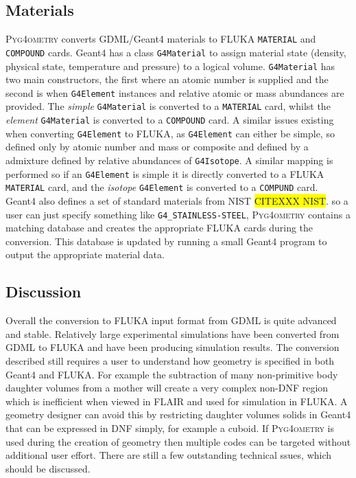 \documentclass[final,5p,times,twocolumn]{elsarticle}
\newcommand{\pyinline}[1]{\lstinline[postbreak={}]{#1}}
\newcommand{\cpinline}[1]{\lstinline[postbreak={}]{#1}}
\newcommand{\fluka}[1]{\texttt{\MakeUppercase{#1}}}
\newcommand{\PYGEOMETRY}{\textsc{Pyg4ometry}}
\begin{document}
\subsection{Materials}
\PYGEOMETRY{} converts GDML/Geant4 materials to FLUKA \verb|MATERIAL| and \verb|COMPOUND| cards.
Geant4 has a class \cpinline{G4Material} to assign material state (density, physical state, temperature and pressure) 
to a logical volume. \cpinline{G4Material} has two main constructors, the first where an atomic number is supplied and 
the second is when \cpinline{G4Element} instances and relative atomic or mass abundances are provided. The {\em simple}
\cpinline{G4Material} is converted to a \fluka{material} card, whilst the {\em element} \cpinline{G4Material}  is converted to a 
\fluka{compound} card. A similar issues existing when converting \cpinline{G4Element} to FLUKA, as \cpinline{G4Element}
can either be simple, so defined only by atomic number and mass or composite and defined by a admixture defined by 
relative abundances of \cpinline{G4Isotope}. A similar mapping is performed so if an \cpinline{G4Element} is simple it is 
directly converted to a FLUKA \fluka{MATERIAL} card, and the {\it isotope} \cpinline{G4Element} is converted to a \fluka{compund}
card. Geant4 also defines a set of standard materials from NIST  \colorbox{yellow}{CITEXXX NIST}. so a user can just specify something like 
\pyinline{G4_STAINLESS-STEEL}, \PYGEOMETRY{}  contains a matching database and creates the appropriate FLUKA 
cards during the conversion. This database is updated by running a small Geant4 program to output the appropriate
material data.

\subsection{Discussion}
Overall the conversion to FLUKA input format from GDML is quite 
advanced and stable. Relatively large experimental simulations 
have been converted from GDML to FLUKA and have been producing 
simulation results. The conversion described still requires a user to
understand how geometry is specified in both Geant4 and FLUKA. For 
example the subtraction of many non-primitive body daughter volumes from 
a mother will create a very complex non-DNF region which is inefficient when viewed in 
FLAIR and used for simulation in FLUKA. A geometry designer can avoid this by 
restricting daughter volumes solids in Geant4 that can be expressed in DNF simply,
for example a cuboid.  If \PYGEOMETRY{} is used during the creation of
 geometry then multiple codes can be targeted without additional user effort. 
 There are still a few outstanding technical  ssues, which should be discussed. 
\end{document}
